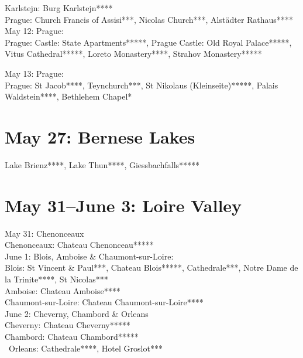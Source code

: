 Karlstejn: Burg Karlstejn****\\
Prague: Church Francis of Assisi***, Nicolas Church***, Alst\"adter Rathaus****\\

May 12: Prague:\\
Prague: Castle: State Apartments*****, Prague Castle: Old Royal Palace*****, Vitus Cathedral*****, Loreto Monastery****, Strahov Monastery*****

May 13: Prague:\\
Prague: St Jacob****, Teynchurch***, St Nikolaus (Kleinseite)*****, Palais Waldstein****, Bethlehem Chapel*

\section{May 27: Bernese Lakes}
\label{Brienz2012}

Lake Brienz****, Lake Thun****, Giessbachfalls*****

\section{May 31--June 3: Loire Valley}
\label{2012Loire}

May 31: Chenonceaux\\
Chenonceaux: Chateau Chenonceau*****\\

June 1: Blois, Amboise \& Chaumont-sur-Loire:\\
Blois: St Vincent \& Paul***, Chateau Blois*****, Cathedrale***, Notre Dame de la Trinite****, St Nicolas***\\
Amboise: Chateau Amboise****\\
Chaumont-sur-Loire: Chateau Chaumont-sur-Loire****\\

June 2:  Cheverny, Chambord \& Orleans\\
Cheverny: Chateau Cheverny*****\\
Chambord: Chateau Chambord*****\\\
Orleans: Cathedrale****, Hotel Groslot***\\

